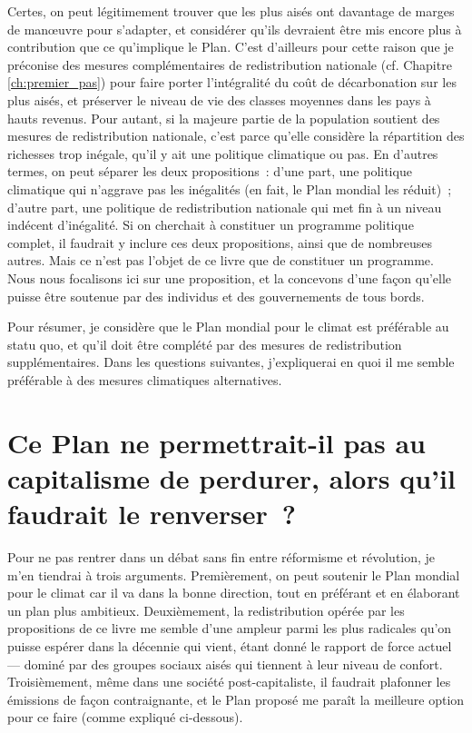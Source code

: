 \documentclass[a5paper,french,openany]{memoir}
\begin{document}
Certes, on peut légitimement trouver que les plus aisés ont davantage de marges de manœuvre pour s'adapter, et considérer qu'ils devraient être mis encore plus à contribution que ce qu'implique le Plan. C'est d'ailleurs pour cette raison que je préconise des mesures complémentaires de redistribution nationale (cf. Chapitre \ref{ch:premier_pas}) pour faire porter l'intégralité du coût de décarbonation sur les plus aisés, et préserver le niveau de vie des classes moyennes dans les pays à hauts revenus. Pour autant, si la majeure partie de la population soutient des mesures de redistribution nationale, c'est parce qu'elle considère la répartition des richesses trop inégale, qu'il y ait une politique climatique ou pas. En d'autres termes, on peut séparer les deux propositions~: d'une part, une politique climatique qui n'aggrave pas les inégalités (en fait, le Plan mondial les réduit)~; d'autre part, une politique de redistribution nationale qui met fin à un niveau indécent d'inégalité. Si on cherchait à constituer un programme politique complet, il faudrait y inclure ces deux propositions, ainsi que de nombreuses autres. Mais ce n'est pas l'objet de ce livre que de constituer un programme. Nous nous focalisons ici sur une proposition, et la concevons d'une façon qu'elle puisse être soutenue par des individus et des gouvernements de tous bords. 

Pour résumer, je considère que le Plan mondial pour le climat est préférable au statu quo, et qu'il doit être complété par des mesures de redistribution supplémentaires. Dans les questions suivantes, j'expliquerai en quoi il me semble préférable à des mesures climatiques alternatives. 


\section*{\normalsize Ce Plan ne permettrait-il pas au capitalisme de perdurer, alors qu'il faudrait le renverser~?}\label{q:capitalisme}

Pour ne pas rentrer dans un débat sans fin entre réformisme et révolution, je m'en tiendrai à trois arguments. Premièrement, on peut soutenir le Plan mondial pour le climat car il va dans la bonne direction, tout en préférant et en élaborant un plan plus ambitieux. Deuxièmement, la redistribution opérée par les propositions de ce livre me semble d'une ampleur parmi les plus radicales qu'on puisse espérer %
dans la décennie qui vient, étant donné le rapport de force actuel --- dominé par des groupes sociaux aisés qui tiennent à leur niveau de confort. %
Troisièmement, même dans une société post-capitaliste, il faudrait plafonner les émissions de façon contraignante, et le Plan proposé me paraît la meilleure option pour ce faire (comme expliqué ci-dessous). 
\end{document}
